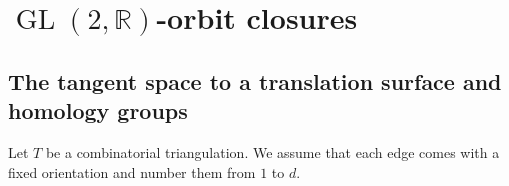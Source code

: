 \documentclass[a4paper,12pt]{article}
\def\bR{\mathbb{R}}
\def\cA{\mathcal{A}}
\def\cE{\mathcal{E}}
\def\GL{\operatorname{GL}}
\begin{document}
%
%
%
%


%
%
%
%


\section{$\GL(2,\bR)$-orbit closures}

\subsection{The tangent space to a translation surface and homology groups}
Let $T$ be a combinatorial triangulation. We assume that each edge comes with
a fixed orientation and number them from $1$ to $d$.
\end{document}
